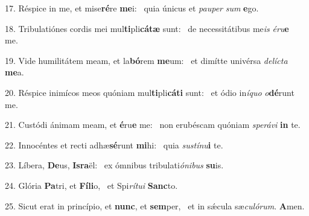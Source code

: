 17. Réspice in me, et mise\textbf{ré}re \textbf{me}i: \ast\  quia únicus et \textit{pau}\textit{per} \textit{sum} \textbf{e}go.\

18. Tribulatiónes cordis mei mul\textbf{ti}pli\textbf{cá}\textbf{tæ} sunt: \ast\  de necessitátibus me\textit{is} \textit{é}\textit{ru}\textbf{e} me.\

19. Vide humilitátem meam, et la\textbf{bó}rem \textbf{me}um: \ast\  et dimítte univérsa \textit{de}\textit{líc}\textit{ta} \textbf{me}a.\

20. Réspice inimícos meos quóniam mul\textbf{ti}pli\textbf{cá}\textbf{ti} sunt: \ast\  et ódio in\textit{í}\textit{quo} \textit{o}\textbf{dé}runt me.\

21. Custódi ánimam meam, et \textbf{é}ru\textbf{e} me: \ast\  non erubéscam quóniam \textit{spe}\textit{rá}\textit{vi} \textbf{in} te.\

22. Innocéntes et recti adhæ\textbf{sé}runt \textbf{mi}hi: \ast\  quia \textit{sus}\textit{tí}\textit{nu}\textbf{i} te.\

23. Líbera, \textbf{De}us, \textbf{Is}\textbf{ra}ël: \ast\  ex ómnibus tribulati\textit{ó}\textit{ni}\textit{bus} \textbf{su}is.\

24. Glória \textbf{Pa}tri, et \textbf{Fí}\textbf{li}o, \ast\  et Spi\textit{rí}\textit{tu}\textit{i} \textbf{Sanc}to.\

25. Sicut erat in princípio, et \textbf{nunc}, et \textbf{sem}per, \ast\  et in sǽcula sæ\textit{cu}\textit{ló}\textit{rum}. \textbf{A}men.\

